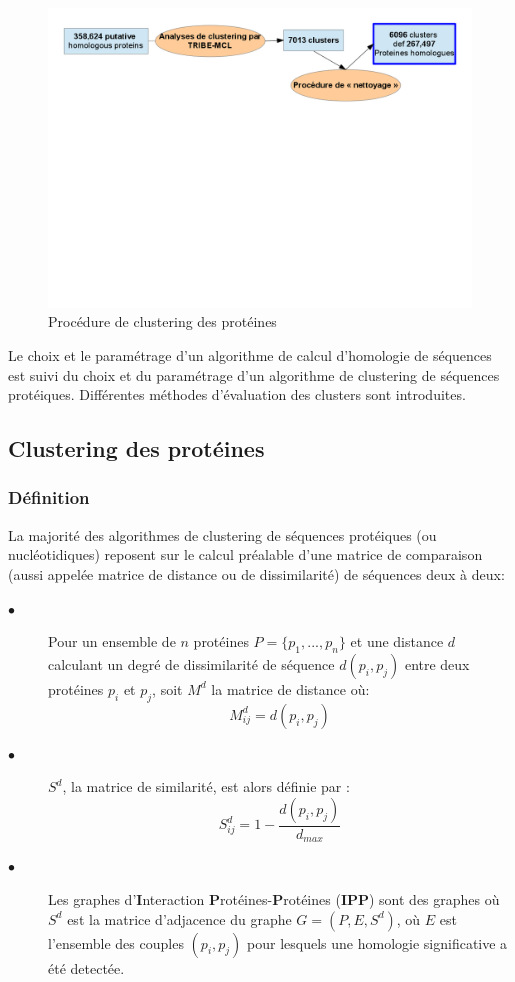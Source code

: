 \begin{figure}[H]
	\includegraphics[width=\textwidth, trim= 0cm 14cm 0cm 0cm ,clip]{./img/workflow_sub2.png}
	\caption{Procédure de clustering des protéines}\label{figstep2}
\end{figure}  
	
Le choix et le paramétrage d'un algorithme de calcul d'homologie de séquences est suivi du choix et du paramétrage d'un algorithme de clustering de séquences protéiques. Différentes méthodes d'évaluation des clusters sont introduites. 



\subsection{Clustering des protéines}
\subsubsection{Définition}
	La majorité des algorithmes de clustering de séquences protéiques (ou nucléotidiques) reposent sur le calcul préalable d'une matrice de comparaison (aussi appelée matrice de distance ou de dissimilarité) de séquences deux à deux:
	\begin{description}
		\item[$\bullet$]  Pour un ensemble de $n$ protéines $P=\{p_{1},...,p_{n}\}$ et une distance $d$ calculant un degré de dissimilarité de séquence $d(p_{i},p_{j})$ entre deux protéines $p_{i}$ et $p_{j}$, soit $M^{d}$ la matrice de distance où: 
			\begin{equation}
				M_{ij}^{d}=d(p_{i},p_{j})
			\end{equation}
		\item[$\bullet$] $S^{d}$, la matrice de similarité, est alors définie par :
			\begin{equation}
				S^{d}_{ij}=1-\frac{d(p_{i},p_{j})}{d_{max}}
			\end{equation}
		\item[$\bullet$] Les graphes d'\textbf{I}nteraction \textbf{P}rotéines-\textbf{P}rotéines (\textbf{IPP}) sont des graphes où $S^{d}$ est la matrice d'adjacence du graphe $G=(P,E,S^{d})$, où $E$ est l'ensemble des couples $(p_{i},p_{j})$ pour lesquels une homologie significative a été detectée.
	\end{description}



